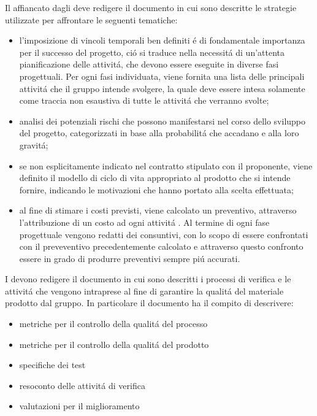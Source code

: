 Il \responsabile{} affiancato dagli \amministratori{} deve redigere il documento \PdPv{} in cui sono descritte le strategie utilizzate per affrontare le seguenti tematiche:

\begin{itemize}
    \item l'imposizione di vincoli temporali ben definiti \'{e} di fondamentale importanza per il successo del progetto, ci\'o si traduce nella necessit\'a di un'attenta pianificazione delle attivit\'a, che devono essere eseguite in diverse fasi progettuali. Per ogni fasi individuata, viene fornita una lista delle principali attivit\'a che il gruppo intende svolgere, la quale deve essere intesa solamente come traccia non esaustiva di tutte le attivit\'a che verranno svolte;
    \item analisi dei potenziali rischi che possono manifestarsi nel corso dello sviluppo del progetto, categorizzati in base alla probabilit\'a che accadano e alla loro gravit\'a;
    \item se non esplicitamente indicato nel contratto stipulato con il proponente, viene definito il modello di ciclo di vita appropriato al prodotto che si intende fornire, indicando le motivazioni che hanno portato alla scelta effettuata;
    \item al fine di stimare i costi previsti, viene calcolato un preventivo, attraverso l'attribuzione di un costo ad ogni attivit\'a . Al termine di ogni fase progettuale vengono redatti dei consuntivi, con lo scopo di essere confrontati con il preveventivo precedentemente calcolato e attraverso questo confronto essere in grado di produrre preventivi sempre pi\'u accurati.
\end{itemize}

I \verificatori{} devono redigere il documento \PdQv{} in cui sono descritti i processi di verifica e le attivit\'a che vengono intraprese al fine di garantire la qualit\'a del materiale prodotto dal gruppo. In particolare il documento ha il compito di descrivere:

\begin{itemize}
    \item metriche per il controllo della qualit\'a del processo
    \item metriche per il controllo della qualit\'a del prodotto
    \item specifiche dei test
    \item resoconto delle attivit\'a di verifica
    \item valutazioni per il miglioramento
\end{itemize}